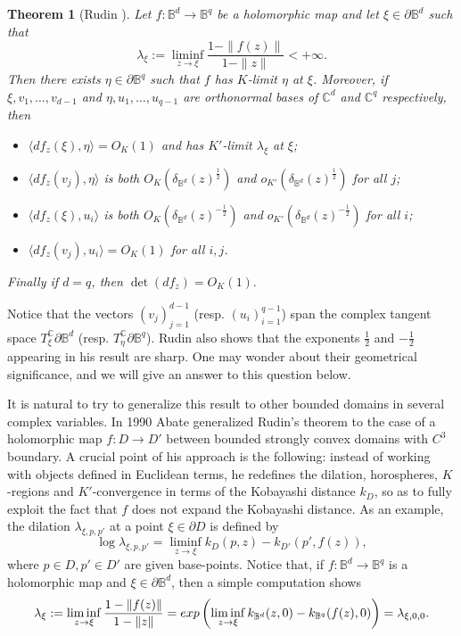 \documentclass[11pt, reqno]{amsart}
\numberwithin{equation}{section}
\newtheorem{theorem}{Theorem}[section]
\theoremstyle{definition}
\newcommand{\C}{\mathbb{C}}
\newcommand{\B}{\mathbb{B}}
\begin{document}
	\begin{theorem}[Rudin \cite{Rudin}]
		Let $f\colon\B^d\to\B^q$ be a holomorphic map and let  $\xi\in\partial\B^d$ such that
		$$\lambda_\xi:=\liminf_{z\to\xi}\frac{1-\|f(z)\|}{1-\|z\|}<+\infty.$$
		Then there exists $\eta\in \partial \B^q$ such that $f$ has $K$-limit $\eta$ at $\xi$. Moreover, if $\xi, v_1,\dots, v_{d-1}$ and $\eta,u_1,\dots, u_{q-1}$ are orthonormal  bases  of $\C^d$ and $\C^q$  respectively, then
		\begin{itemize}
			\item[(i)] $\langle df_z(\xi),\eta\rangle=O_K(1)$  and has  $K'$-limit $\lambda_\xi$ at $\xi$;
			\item[(ii)]  $\langle df_z(v_j),\eta \rangle$ is both $O_K(\delta_{\B^d}(z)^{\frac{1}{2}})$ and   $o_{K'}(\delta_{\B^d}(z)^{\frac{1}{2}})$ for all $j$;
			\item[(iii)]  $\langle df_z(\xi),u_i\rangle$ is both $O_K(\delta_{\B^d}(z)^{-\frac{1}{2}})$ and   $o_{K'}(\delta_{\B^d}(z)^{-\frac{1}{2}})$ for all $i$; 
			\item[(iv)]  $\langle df_z(v_j),u_i \rangle=O_K(1)$ for all $i,j$.
		\end{itemize}
		Finally if $d=q$, then $\det(df_z)=O_K(1).$
	\end{theorem}
	Notice that the vectors $(v_j)_{j=1}^{d-1}$ (resp. $(u_i)_{i=1}^{q-1}$) span the complex tangent space $T_\xi^\C\partial \B^d$ (resp. $T_\eta^\C\partial \B^q$).
	Rudin also shows that the exponents $\frac{1}{2}$ and $-\frac{1}{2}$ appearing in his result are sharp. One may   wonder about their geometrical significance, and we will give an answer to this question below. 
	
	
	It is natural to try to generalize this result to other bounded domains in several complex variables.
	In  1990  Abate  \cite{Abatelindelof, AbateSymp}   generalized   
	Rudin's  theorem to the case of a holomorphic map $f\colon D\to D'$ between bounded strongly convex domains with $C^3$ boundary.
	A crucial point of his approach is the following: instead of working with objects defined in Euclidean terms, he redefines the dilation, horospheres, $K$-regions and $K'$-convergence in terms of the Kobayashi distance $k_D$, so as to fully exploit the fact that $f$ does not expand the Kobayashi distance.
	As an example, the dilation $\lambda_{\xi,p,p'}$ at a point $\xi\in \partial D$ is defined by
	\begin{equation}\label{defdil}\log\lambda_{\xi,p,p'}=\liminf_{z\to\xi}k_D(p,z)-k_{D'}(p',f(z)),
	\end{equation}
	where $p\in D,p'\in D'$ are given base-points.
	Notice that, if $f\colon\B^d\to \B^q$ is a holomorphic map and $\xi\in \partial \B^d$, then a  simple computation shows 
	\begin{equation}\label{dilatazionekob}
		\lambda_\xi:=\liminf_{z\to \xi}\frac{1-\|f(z)\|}{1-\|z\|}={\rm exp}\left(\liminf_{z\to\xi}{k_{\B^d}}(z,0)-k_{\B^q}(f(z),0)\right)=\lambda_{\xi,0,0}.
	\end{equation}
	
\end{document}
